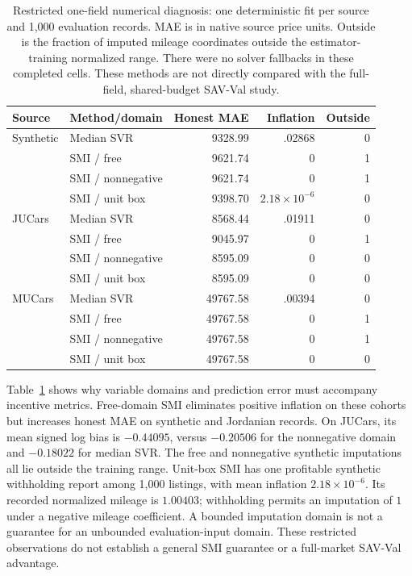 \documentclass[10pt,journal]{IEEEtran}
\begin{document}
\begin{table}[t]
\centering
\caption{Restricted one-field numerical diagnosis: one deterministic fit
per source and 1,000 evaluation records. MAE is in native source price
units. Outside is the fraction of imputed mileage coordinates outside the
estimator-training normalized range. There were no solver fallbacks in
these completed cells. These methods are not directly compared with the
full-field, shared-budget SAV-Val study.}
\label{tab:numeric_smi}
\begin{tabular}{llrrr}
\toprule
Source & Method/domain & Honest MAE & Inflation & Outside\\
\midrule
Synthetic & Median SVR & 9328.99 & .02868 & 0\\
 & SMI / free & 9621.74 & 0 & 1\\
 & SMI / nonnegative & 9621.74 & 0 & 1\\
 & SMI / unit box & 9398.70 & $2.18\!\times\!10^{-6}$ & 0\\
\midrule
JUCars & Median SVR & 8568.44 & .01911 & 0\\
 & SMI / free & 9045.97 & 0 & 1\\
 & SMI / nonnegative & 8595.09 & 0 & 0\\
 & SMI / unit box & 8595.09 & 0 & 0\\
\midrule
MUCars & Median SVR & 49767.58 & .00394 & 0\\
 & SMI / free & 49767.58 & 0 & 1\\
 & SMI / nonnegative & 49767.58 & 0 & 1\\
 & SMI / unit box & 49767.58 & 0 & 0\\
\bottomrule
\end{tabular}
\end{table}

Table~\ref{tab:numeric_smi} shows why variable domains and prediction
error must accompany incentive metrics. Free-domain SMI eliminates
positive inflation on these cohorts but increases honest MAE on
synthetic and Jordanian records. On JUCars, its mean signed log bias is
$-0.44095$, versus $-0.20506$ for the nonnegative domain and $-0.18022$
for median SVR. The free and nonnegative synthetic imputations all lie
outside the training range. Unit-box SMI has one profitable synthetic
withholding report among 1,000 listings, with mean inflation
$2.18\times10^{-6}$. Its recorded normalized mileage is $1.00403$;
withholding permits an imputation of $1$ under a negative mileage
coefficient. A bounded imputation domain is not a guarantee
for an unbounded evaluation-input domain. These restricted observations
do not establish a general SMI guarantee or a full-market SAV-Val
advantage.
\end{document}
